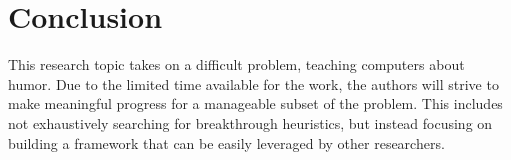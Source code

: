 
\section{Conclusion}

This research topic takes on a difficult problem, teaching computers about humor. Due to the limited time available for the work, the authors will strive to make meaningful progress for a manageable subset of the problem.  This includes not exhaustively searching for breakthrough heuristics, but instead focusing on building a framework that can be easily leveraged by other researchers. 